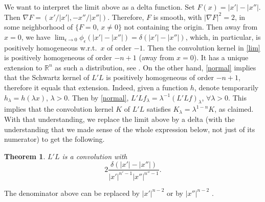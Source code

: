 \documentclass[11pt]{amsart}
\newtheorem{theorem}{Theorem}[section]
\theoremstyle{definition}
\theoremstyle{remark}
\numberwithin{equation}{section}
\newcommand{\Rn}{\mathbb{R}^n}
\begin{document}
We want to interpret the limit above as a delta function. Set $F(x) = |x'|-|x''|$. Then $\nabla F = (x'/|x'|, -x''/|x''|)$. Therefore, $F$ is smooth, with $|\nabla F|^2=2$, in some neighborhood of $\{F=0, \, x\not=0\}$ not containing the origin. Then away from $x=0$, we have $\lim_{\epsilon\to0} \phi_\epsilon(|x'|-|x''|)=\delta(|x'|- |x''|)$, which, in particular, is positively homogeneous w.r.t.\ $x$ of order $-1$. Then the convolution kernel in \eqref{lim} is positively homogeneous of order $-n+1$ (away from $x=0$). It has a unique extension to $\Rn$ as such a distribution, see \cite[Theorem 3.2.3]{Hormander1}. On the other hand, 
 \eqref{normal} implies  that the Schwartz kernel of $L'L$ is positively homogeneous of order $-n+1$, therefore it equals that extension. Indeed, given a function $h$, denote temporarily $h_\lambda=h(\lambda x)$, $\lambda >0$. Then by \eqref{normal}, $L'Lf_\lambda = \lambda^{-1}(L'Lf)_{\lambda} $, $\forall \lambda>0$. This implies that the convolution kernel $K$ of $L'L$ satisfies $K_\lambda = \lambda^{1-n} K$, as claimed.  With that understanding, we replace the limit above by a delta (with the understanding that we made sense of the whole expression below, not just of its numerator) to get the following. 

 
 
\begin{theorem}\label{thm_L''L}
	$L'L$ is a convolution with
	\[
	2\frac{\delta(|x'|-|x''|)}{|x '|^{n'-1} |x ''|^{n''-1}}.
	\]
\end{theorem} 

The denominator above can be replaced by $|x'|^{n-2}$ or by $|x''|^{n-2}$ .
\end{document}
